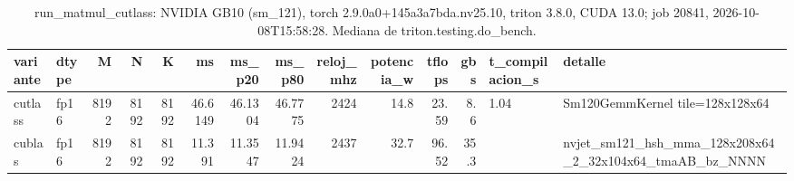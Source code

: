 \begin{table}[htbp]
  \centering\small
  \begin{tabular}{llrrrrrrrrrrll}
    \toprule
    variante & dtype & M & N & K & ms & ms\_p20 & ms\_p80 & reloj\_mhz & potencia\_w & tflops & gbs & t\_compilacion\_s & detalle \\
    \midrule
    cutlass & fp16 & 8192 & 8192 & 8192 & 46.6149 & 46.1304 & 46.7775 & 2424 & 14.8 & 23.59 & 8.6 & 1.04 & Sm120GemmKernel tile=128x128x64 \\
    cublas & fp16 & 8192 & 8192 & 8192 & 11.391 & 11.3547 & 11.9424 & 2437 & 32.7 & 96.52 & 35.3 &  & nvjet\_sm121\_hsh\_mma\_128x208x64\_2\_32x104x64\_tmaAB\_bz\_NNNN \\
    \bottomrule
  \end{tabular}
  \caption{run\_matmul\_cutlass: NVIDIA GB10 (sm\_121), torch 2.9.0a0+145a3a7bda.nv25.10, triton 3.8.0, CUDA 13.0; job 20841, 2026-10-08T15:58:28. Mediana de triton.testing.do\_bench.}
  \label{tab:hennessy-frio-run-matmul-cutlass}
\end{table}
